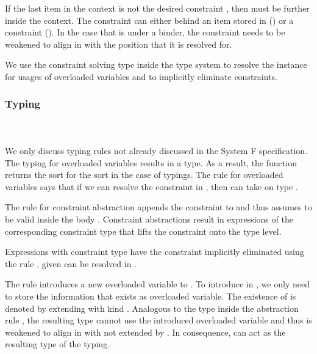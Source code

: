 \noindent If the last item in the context is not the desired constraint , then  must be further inside the context. The constraint can either behind an item stored in  () or a constraint (). In the case that  is under a binder, the constraint needs to be weakened to align in  with the position that it is resolved for.

\noindent We use the constraint solving type inside the type system to resolve the instance for usages of overloaded variables and to implicitly eliminate constraints.

\subsubsection{Typing}\hfill\\\\
We only discuss typing rules not already discussed in the System F specification. The typing for overloaded variables results in a type. As a result, the  function returns the sort  for the sort  in the case of typings.
\FoTyping
The rule for overloaded variables  says that if we can resolve the constraint  \Constr{:}  in , then  can take on type . 

\noindent The rule for constraint abstraction  appends the constraint  to  and thus assumes  to be valid inside the body . Constraint abstractions result in expressions of the corresponding constraint type \Constr{[}  \Constr{]⇒}  that lifts the constraint onto the type level.

\noindent Expressions  with constraint type \Constr{[}  \Constr{]⇒}  have the constraint implicitly eliminated using the rule , given  can be resolved in .

\noindent The rule  introduces a new overloaded variable  to . 
To introduce  in , we only need to store the information that  exists as overloaded variable. The existence of  is denoted by extending  with kind .
Analogous to the type  inside the abstraction rule , the resulting type  cannot use the introduced overloaded variable and thus is weakened to align in  with  not extended by . In consequence,  can act as the resulting type of the typing.

